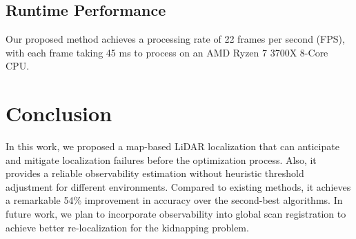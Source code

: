 \subsection{Runtime Performance}
Our proposed method achieves a processing rate of 22 frames per second (FPS), with each frame taking 45 ms to process on an AMD Ryzen 7 3700X 8-Core CPU.
\section{Conclusion}
In this work, we proposed a map-based LiDAR localization that can anticipate and mitigate localization failures before the optimization process. Also, it provides a reliable observability estimation without heuristic threshold adjustment for different environments. Compared to existing methods, it achieves a remarkable 54\% improvement in accuracy over the second-best algorithms. In future work, we plan to incorporate observability into global scan registration to achieve better re-localization for the kidnapping problem.  